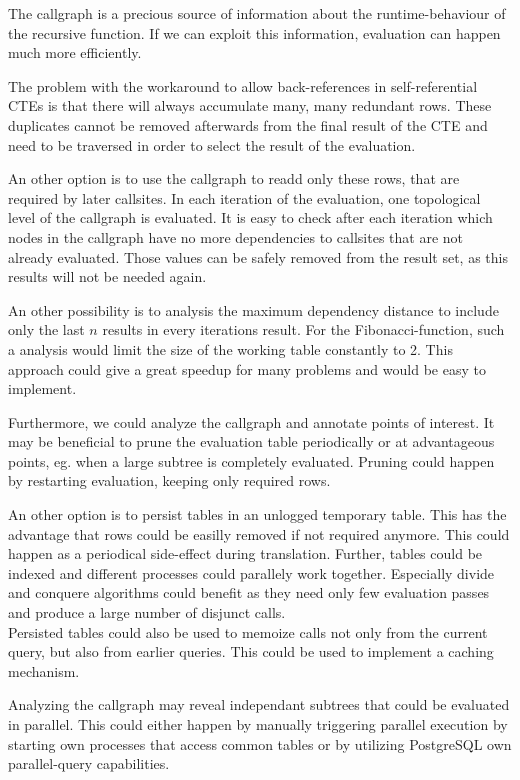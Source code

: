 The callgraph is a precious source of information about the runtime-behaviour of the recursive function. If we can exploit this information, evaluation can happen much more efficiently.

The problem with the workaround to allow back-references in self-referential CTEs is that there will always accumulate many, many redundant rows. These duplicates cannot be removed afterwards from the final result of the CTE and need to be traversed in order to select the result of the evaluation.

An other option is to use the callgraph to readd only these rows, that are required by later callsites. In each iteration of the evaluation, one topological level of the callgraph is evaluated. It is easy to check after each iteration which nodes in the callgraph have no more dependencies to callsites that are not already evaluated. Those values can be safely removed from the result set, as this results will not be needed again.

An other possibility is to analysis the maximum dependency distance to include only the last $n$ results in every iterations result. For the Fibonacci-function, such a analysis would limit the size of the working table constantly to 2. This approach could give a great speedup for many problems and would be easy to implement.

Furthermore, we could analyze the callgraph and annotate points of interest. It may be beneficial to prune the evaluation table periodically or at advantageous points, eg. when a large subtree is completely evaluated. Pruning could happen by restarting evaluation, keeping only required rows.

An other option is to persist tables in an unlogged temporary table. This has the advantage that rows could be easilly removed if not required anymore. This could happen as a periodical side-effect during translation. Further, tables could be indexed and different processes could parallely work together. Especially divide and conquere algorithms could benefit as they need only few evaluation passes and produce a large number of disjunct calls.\\
Persisted tables could also be used to memoize calls not only from the current query, but also from earlier queries. This could be used to implement a caching mechanism.

Analyzing the callgraph may reveal independant subtrees that could be evaluated in parallel. This could either happen by manually triggering parallel execution by starting own processes that access common tables or by utilizing PostgreSQL own parallel-query capabilities. 